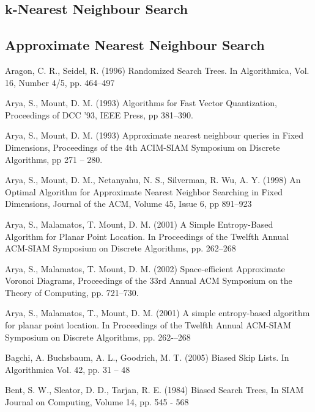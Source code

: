 \documentclass[mcs]{scsthesis}
\begin{document}
\subsection{k-Nearest Neighbour Search}

\subsection{Approximate Nearest Neighbour Search}


\begin{thebibliography}{5}

Aragon, C. R.,  Seidel, R. (1996) Randomized Search Trees.
In Algorithmica, Vol. 16, Number 4/5, pp. 464--497

Arya, S., Mount, D. M. (1993) Algorithms for Fast Vector Quantization,
Proceedings of DCC '93, IEEE Press, pp 381--390. 

Arya, S., Mount, D. M. (1993) Approximate nearest neighbour queries in Fixed
Dimensions, Proceedings of the 4th ACIM-SIAM Symposium on Discrete Algorithms,
pp 271 -- 280.

Arya, S., Mount, D. M., Netanyahu, N. S., Silverman, R. Wu, A. Y. (1998)
An Optimal Algorithm for Approximate Nearest Neighbor Searching in Fixed
Dimensions, Journal of the ACM, Volume 45, Issue 6, pp 891--923

Arya, S., Malamatos, T. Mount, D. M. (2001) A Simple Entropy-Based Algorithm
for Planar Point Location. In Proceedings of the Twelfth Annual ACM-SIAM
Symposium on Discrete Algorithms, pp. 262--268

Arya, S., Malamatos, T. Mount, D. M. (2002) Space-efficient Approximate
Voronoi Diagrams, Proceedings of the 33rd Annual ACM Symposium on the Theory
of Computing, pp. 721--730.

Arya, S., Malamatos, T., Mount, D. M. (2001) A simple entropy-based algorithm for planar point location.
In Proceedings of the Twelfth Annual ACM-SIAM Symposium on Discrete Algorithms,
pp. 262-–268

Bagchi, A. Buchsbaum, A. L., Goodrich, M. T. (2005) Biased Skip Lists.
In Algorithmica Vol. 42, pp. 31 – 48

Bent, S. W., Sleator, D. D., Tarjan, R. E. (1984) Biased Search Trees,
In SIAM Journal on Computing, Volume 14, pp. 545 - 568


\end{thebibliography}
\end{document}
